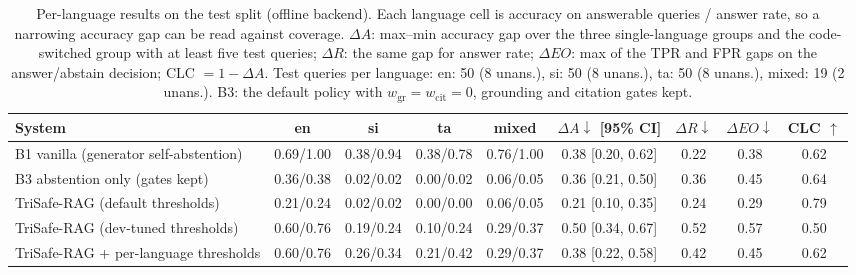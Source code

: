 \begin{table}[t]
  \caption{Per-language results on the test split (offline backend). Each language cell is accuracy on answerable queries / answer rate, so a narrowing accuracy gap can be read against coverage. $\Delta A$: max--min accuracy gap over the three single-language groups and the code-switched group with at least five test queries; $\Delta R$: the same gap for answer rate; $\Delta EO$: max of the TPR and FPR gaps on the answer/abstain decision; CLC $= 1-\Delta A$. Test queries per language: en: 50 (8 unans.), si: 50 (8 unans.), ta: 50 (8 unans.), mixed: 19 (2 unans.). B3: the default policy with $w_{\mathrm{gr}}{=}w_{\mathrm{cit}}{=}0$, grounding and citation gates kept.}
  \label{tab:fair-offline}
  \footnotesize
  \setlength{\tabcolsep}{3.5pt}
  \begin{tabular}{lcccccccc}
    \toprule
    System & en & si & ta & mixed & $\Delta A \downarrow$ [95\% CI] & $\Delta R \downarrow$ & $\Delta EO \downarrow$ & CLC $\uparrow$ \\
    \midrule
    B1 vanilla (generator self-abstention) & 0.69/1.00 & 0.38/0.94 & 0.38/0.78 & 0.76/1.00 & 0.38 [0.20, 0.62] & 0.22 & 0.38 & 0.62 \\
    B3 abstention only (gates kept) & 0.36/0.38 & 0.02/0.02 & 0.00/0.02 & 0.06/0.05 & 0.36 [0.21, 0.50] & 0.36 & 0.45 & 0.64 \\
    TriSafe-RAG (default thresholds) & 0.21/0.24 & 0.02/0.02 & 0.00/0.00 & 0.06/0.05 & 0.21 [0.10, 0.35] & 0.24 & 0.29 & 0.79 \\
    TriSafe-RAG (dev-tuned thresholds) & 0.60/0.76 & 0.19/0.24 & 0.10/0.24 & 0.29/0.37 & 0.50 [0.34, 0.67] & 0.52 & 0.57 & 0.50 \\
    TriSafe-RAG + per-language thresholds & 0.60/0.76 & 0.26/0.34 & 0.21/0.42 & 0.29/0.37 & 0.38 [0.22, 0.58] & 0.42 & 0.45 & 0.62 \\
    \bottomrule
  \end{tabular}
\end{table}
